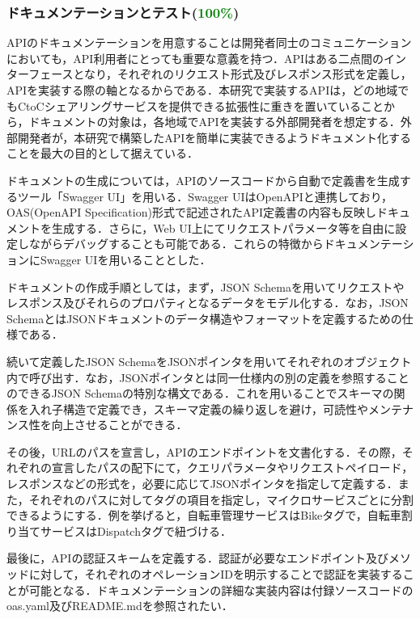       \subsubsection{ドキュメンテーションとテスト(\textcolor{green}{100\%})}
        \label{sec:ドキュメンテーションとテスト}
          \par APIのドキュメンテーションを用意することは開発者同士のコミュニケーションにおいても，API利用者にとっても重要な意義を持つ．APIはある二点間のインターフェースとなり，それぞれのリクエスト形式及びレスポンス形式を定義し，APIを実装する際の軸となるからである．本研究で実装するAPIは，どの地域でもCtoCシェアリングサービスを提供できる拡張性に重きを置いていることから，ドキュメントの対象は，各地域でAPIを実装する外部開発者を想定する．外部開発者が，本研究で構築したAPIを簡単に実装できるようドキュメント化することを最大の目的として据えている．
          \par ドキュメントの生成については，APIのソースコードから自動で定義書を生成するツール「Swagger UI」を用いる．Swagger UIはOpenAPIと連携しており，OAS(OpenAPI Specification)形式で記述されたAPI定義書の内容も反映しドキュメントを生成する．さらに，Web UI上にてリクエストパラメータ等を自由に設定しながらデバッグすることも可能である．これらの特徴からドキュメンテーションにSwagger UIを用いることとした．
          \par ドキュメントの作成手順としては，まず，JSON Schemaを用いてリクエストやレスポンス及びそれらのプロパティとなるデータをモデル化する．なお，JSON SchemaとはJSONドキュメントのデータ構造やフォーマットを定義するための仕様である．
          \par 続いて定義したJSON SchemaをJSONポインタを用いてそれぞれのオブジェクト内で呼び出す．なお，JSONポインタとは同一仕様内の別の定義を参照することのできるJSON Schemaの特別な構文である．これを用いることでスキーマの関係を入れ子構造で定義でき，スキーマ定義の繰り返しを避け，可読性やメンテナンス性を向上させることができる．
          \par その後，URLのパスを宣言し，APIのエンドポイントを文書化する．その際，それぞれの宣言したパスの配下にて，クエリパラメータやリクエストペイロード，レスポンスなどの形式を，必要に応じてJSONポインタを指定して定義する．また，それぞれのパスに対してタグの項目を指定し，マイクロサービスごとに分割できるようにする．例を挙げると，自転車管理サービスはBikeタグで，自転車割り当てサービスはDispatchタグで紐づける．
          \par 最後に，APIの認証スキームを定義する．認証が必要なエンドポイント及びメソッドに対して，それぞれのオペレーションIDを明示することで認証を実装することが可能となる．ドキュメンテーションの詳細な実装内容は付録ソースコードのoas.yaml及びREADME.mdを参照されたい．
